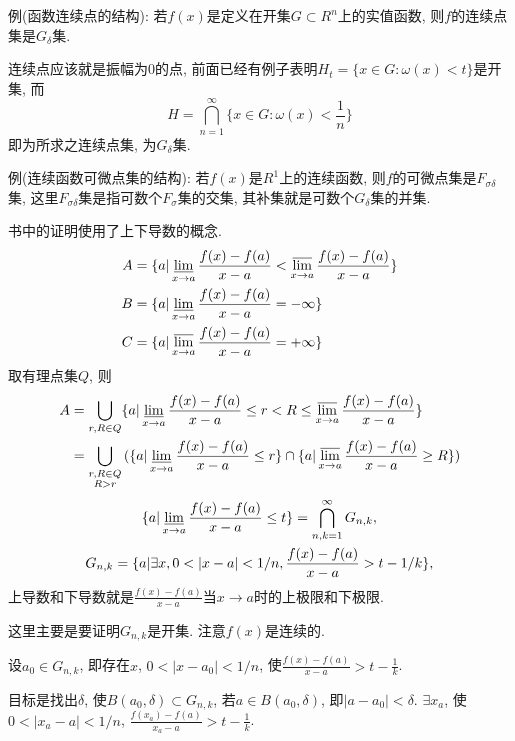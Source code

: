 \documentclass[12pt,a4paper,openany]{book}
\begin{document}
例(函数连续点的结构): 若$f(x)$是定义在开集$G \subset R^n$上的实值函数, 则$f$的连续点集是$G_{\delta}$集.

连续点应该就是振幅为0的点, 前面已经有例子表明$H_t = \{x \in G : \omega(x) < t\}$是开集, 而
\[
H = \bigcap_{n=1}^{\infty}\{x \in G: \omega(x) < \frac{1}{n}\}
\]
即为所求之连续点集, 为$G_{\delta}$集.

例(连续函数可微点集的结构): 若$f(x)$是$R^1$上的连续函数, 则$f$的可微点集是$F_{\sigma\delta}$集, 这里$F_{\sigma\delta}$集是指可数个$F_{\sigma}$集的交集, 其补集就是可数个$G_{\delta}$集的并集.

书中的证明使用了上下导数的概念.
\[
\begin{aligned}
A &= \{ a | \varliminf_{x \rightarrow a}{\frac{f(x) - f(a)}{x - a}} < \varlimsup_{x \rightarrow a}{\frac{f(x) - f(a)}{x - a}} \}\\
B &= \{ a | \varliminf_{x \rightarrow a}{\frac{f(x) - f(a)}{x - a}} = -\infty \}\\
C &= \{ a | \varlimsup_{x \rightarrow a}{\frac{f(x) - f(a)}{x - a}} = +\infty \}
\end{aligned}
\]
取有理点集$Q$, 则
\[
\begin{aligned}
A &= \bigcup_{r,R \in Q}\{a | \varliminf_{x \rightarrow a}{\frac{f(x) - f(a)}{x - a}} \le r < R \le \varlimsup_{x \rightarrow a}{\frac{f(x) - f(a)}{x - a}}\} \\
&= \bigcup_{\substack{r,R \in Q \\R > r}}{(\{a | \varliminf_{x \rightarrow a}{\frac{f(x) - f(a)}{x - a}} \le r\} \cap \{a | \varlimsup_{x \rightarrow a}{\frac{f(x) - f(a)}{x - a}} \ge R\})}
\end{aligned}
\]
\begin{gather*}
\{a | \varliminf_{x \rightarrow a}{\frac{f(x) - f(a)}{x - a}} \le t\} = \bigcap_{n,k=1}^{\infty}{G_{n,k}},\\
G_{n,k} = \{a | \exists x, 0 < |x - a| < 1/n, \frac{f(x)-f(a)}{x-a} > t - 1/k\},
\end{gather*}
上导数和下导数就是$\frac{f(x)-f(a)}{x-a}$当$x \rightarrow a$时的上极限和下极限.

这里主要是要证明$G_{n,k}$是开集. 注意$f(x)$是连续的.

设$a_0 \in G_{n,k}$, 即存在$x$, $0 < |x - a_0| < 1/n$, 使$\frac{f(x)-f(a)}{x-a} > t - \frac{1}{k}$.

目标是找出$\delta$, 使$B(a_0, \delta) \subset G_{n,k}$, 若$a \in B(a_0, \delta)$, 即$|a - a_0| < \delta$. $\exists x_a$, 使$0 < |x_a - a| < 1/n$, $\frac{f(x_a) - f(a)}{x_a - a} > t - \frac{1}{k}$.
\end{document}
